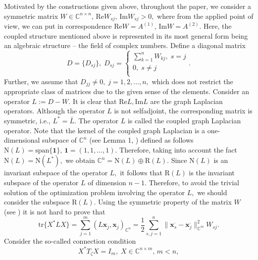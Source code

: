 \documentclass[a4paper,twoside,12pt]{article}
\begin{document}
 Motivated by the   constructions given above,  throughout the paper,  we consider a   symmetric   matrix $W\in \mathbb{C}^{ n\times n },\,\mathrm{Re}W_{sj},\,\mathrm{Im}W_{sj}>0,$  where from the applied point of view,  we can put in correspondence  $\mathrm{Re}W=A^{(1)},\,\mathrm{Im}W=A^{(2)}.$  Here, the coupled structure mentioned above is represented in its  most general form being an algebraic  structure -- the field of  complex numbers. Define a diagonal matrix
$$
D=\{D_{sj}\},\;D_{sj}=\left\{ \begin{aligned}
  \sum\limits_{k=1}^{n}W_{kj},\;s=j \\
 0,\;s\neq j   \\
\end{aligned}
 \right.  .
$$
Further, we assume that $D_{jj}\neq 0,\;j=1,2,\dots,n,$ which does not restrict the appropriate  class of matrices due to the given  sense of the elements.
 Consider an operator  $L:=D-W.$ It is clear that $\mathrm{Re}L,\mathrm{Im}L$ are the graph Laplacian operators.  Although the operator   $L$ is not selfadjoint, the corresponding matrix is symmetric, i.e., $L^{\ast}=\bar{L}.$ The operator $L$ is called   the coupled graph Laplacian operator. Note   that   the kernel of the coupled  graph Laplacian is a one-dimensional subspace of $\mathbb{C}^{n}$ (see Lemma 1, \cite{KABaChu25}) defined as follows
$
\mathrm{N}(L)= \mathrm{span}\{\mathbf{1}\},\,\mathbf{1}=(1,1,\ldots,1).
$
Therefore, taking into account the fact $\mathrm{N}(L)=\mathrm{N}(L^{\ast}),$ we obtain
$
\mathbb{C}^{n}=\mathrm{N}(L) \oplus\mathrm{R}(L).
$
  Since $\mathrm{N}(L)$ is an invariant subspace of the operator  $L,$ it follows that    $\mathrm{R}(L)$  is the invariant subspace of the operator $L$ of  dimension $n-1.$ Therefore,  to avoid the trivial solution of the  optimization problem involving the operator $L,$   we should  consider the subspace $\mathrm{R}(L).$
Using the symmetric property of the matrix $W$ (see \cite{KABaChu25}) it is not hard to prove that
 \begin{equation}\label{1}
  \mathrm{tr}\{X^{\ast}LX\} =  \sum\limits_{j=1}^{m}       ( L\mathbf{x}   _{ j },       \mathbf{x}   _{ j })_{\mathbb{C}^{n}}  =\frac{1}{2} \sum\limits_{s,j=1}^{n}\|\mathbf{x}^{\cdot}_{s}-\mathbf{x}^{\cdot}_{j}\|_{\mathbb{C}^{m}}^{2}W_{sj}.
\end{equation}
  Consider the so-called connection condition
\begin{equation}\label{2}
X^{\ast}T_{\zeta}X= I_{m},\;X\in \mathbb{C}^{n\times m},\,m<n,
\end{equation}
\end{document}
